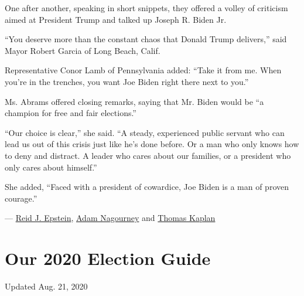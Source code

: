One after another, speaking in short snippets, they offered a volley of
criticism aimed at President Trump and talked up Joseph R. Biden Jr.

``You deserve more than the constant chaos that Donald Trump delivers,''
said Mayor Robert Garcia of Long Beach, Calif.

Representative Conor Lamb of Pennsylvania added: ``Take it from me. When
you're in the trenches, you want Joe Biden right there next to you.''

Ms. Abrams offered closing remarks, saying that Mr. Biden would be ``a
champion for free and fair elections.''

``Our choice is clear,'' she said. ``A steady, experienced public
servant who can lead us out of this crisis just like he's done before.
Or a man who only knows how to deny and distract. A leader who cares
about our families, or a president who only cares about himself.''

She added, ``Faced with a president of cowardice, Joe Biden is a man of
proven courage.''

--- \href{https://www.nytimes3xbfgragh.onion/by/reid-j-epstein}{Reid J.
Epstein},
\href{https://www.nytimes3xbfgragh.onion/by/adam-nagourney}{Adam
Nagourney} and
\href{https://www.nytimes3xbfgragh.onion/by/thomas-kaplan}{Thomas
Kaplan}

\hypertarget{our-2020-election-guide}{%
\section{Our 2020 Election Guide}\label{our-2020-election-guide}}

Updated Aug. 21, 2020

